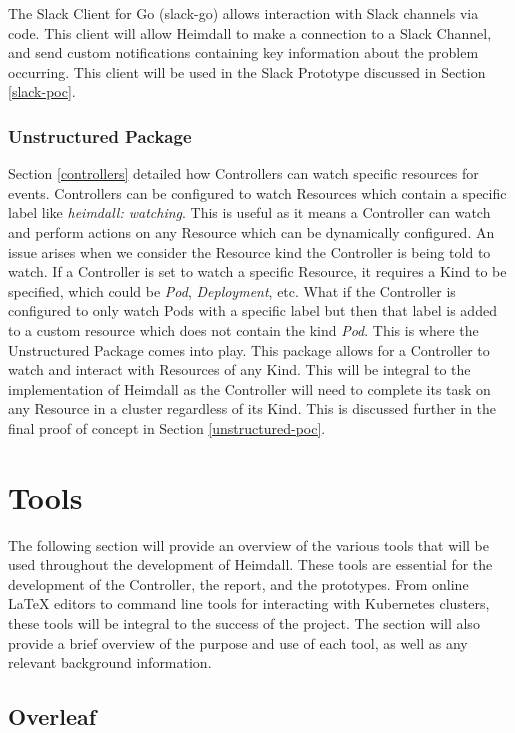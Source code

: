 \documentclass{article}
\begin{document}
The Slack Client for Go (slack-go) allows interaction with Slack channels via code. This client will allow Heimdall to make a connection to a Slack Channel, and send custom notifications containing key information about the problem occurring. This client will be used in the Slack Prototype discussed in Section \ref{slack-poc}.

\subsubsection{Unstructured Package}

Section \ref{controllers} detailed how Controllers can watch specific resources for events. Controllers can be configured to watch Resources which contain a specific label like \emph{heimdall: watching}. This is useful as it means a Controller can watch and perform actions on any Resource which can be dynamically configured. An issue arises when we consider the Resource kind the Controller is being told to watch. If a Controller is set to watch a specific Resource, it requires a Kind to be specified, which could be \emph{Pod}, \emph{Deployment}, etc. What if the Controller is configured to only watch Pods with a specific label but then that label is added to a custom resource which does not contain the kind \emph{Pod}. This is where the Unstructured Package comes into play. This package allows for a Controller to watch and interact with Resources of any Kind. This will be integral to the implementation of Heimdall as the Controller will need to complete its task on any Resource in a cluster regardless of its Kind. This is discussed further in the final proof of concept in Section \ref{unstructured-poc}.



\section{Tools}

The following section will provide an overview of the various tools that will be used throughout the development of Heimdall. These tools are essential for the development of the Controller, the report, and the prototypes. From online LaTeX editors to command line tools for interacting with Kubernetes clusters, these tools will be integral to the success of the project. The section will also provide a brief overview of the purpose and use of each tool, as well as any relevant background information.


\subsection{Overleaf}
\end{document}
